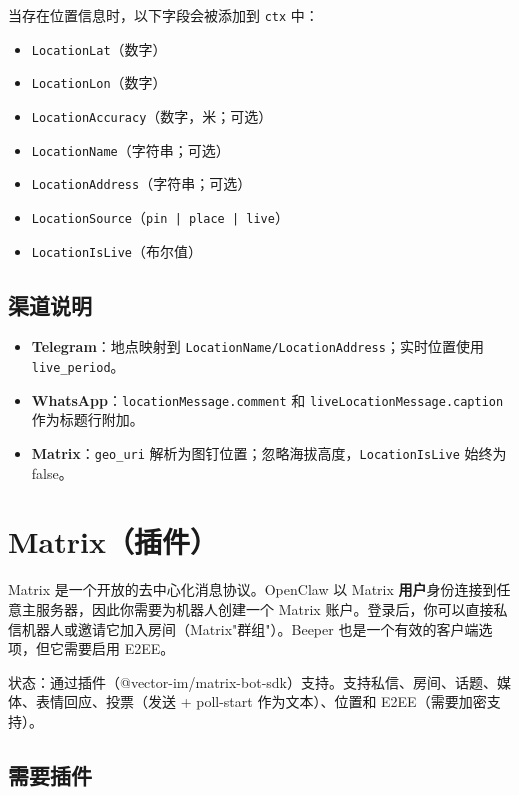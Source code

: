 当存在位置信息时，以下字段会被添加到 \texttt{ctx} 中：

\begin{itemize}
  \item \texttt{LocationLat}（数字）
  \item \texttt{LocationLon}（数字）
  \item \texttt{LocationAccuracy}（数字，米；可选）
  \item \texttt{LocationName}（字符串；可选）
  \item \texttt{LocationAddress}（字符串；可选）
  \item \texttt{LocationSource}（\texttt{pin | place | live}）
  \item \texttt{LocationIsLive}（布尔值）
\end{itemize}


\subsection{渠道说明}


\begin{itemize}
  \item \textbf{Telegram}：地点映射到 \texttt{LocationName/LocationAddress}；实时位置使用 \texttt{live\_period}。
  \item \textbf{WhatsApp}：\texttt{locationMessage.comment} 和 \texttt{liveLocationMessage.caption} 作为标题行附加。
  \item \textbf{Matrix}：\texttt{geo\_uri} 解析为图钉位置；忽略海拔高度，\texttt{LocationIsLive} 始终为 false。
\end{itemize}



\clearpage

\section{Matrix（插件）}


Matrix 是一个开放的去中心化消息协议。OpenClaw 以 Matrix \textbf{用户}身份连接到任意主服务器，因此你需要为机器人创建一个 Matrix 账户。登录后，你可以直接私信机器人或邀请它加入房间（Matrix"群组"）。Beeper 也是一个有效的客户端选项，但它需要启用 E2EE。

状态：通过插件（@vector-im/matrix-bot-sdk）支持。支持私信、房间、话题、媒体、表情回应、投票（发送 + poll-start 作为文本）、位置和 E2EE（需要加密支持）。

\subsection{需要插件}


